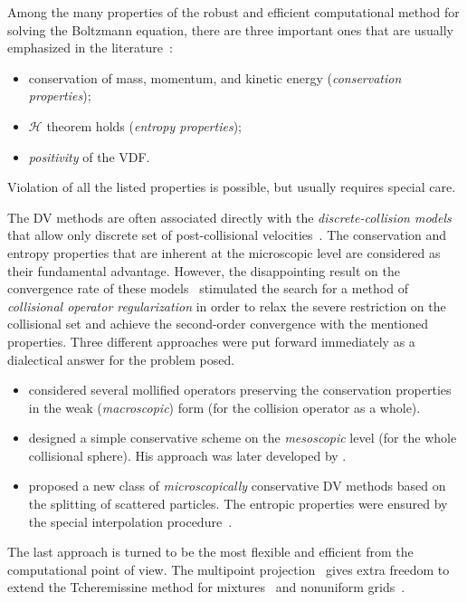 \documentclass{aip-cp}
\begin{document}
Among the many properties of the robust and efficient computational method for solving the Boltzmann equation,
there are three important ones that are usually emphasized in the literature~\cite{Dimarco2014}:
\begin{itemize}
    \item conservation of mass, momentum, and kinetic energy (\emph{conservation properties});
    \item \(\mathcal{H}\) theorem holds (\emph{entropy properties});
    \item \emph{positivity} of the VDF.
\end{itemize}
Violation of all the listed properties is possible, but usually requires special care.

The DV methods are often associated directly with the \emph{discrete-collision models}
that allow only discrete set of post-collisional velocities~\cite{Goldstein1989}.
The conservation and entropy properties that are inherent at the microscopic level are considered as their fundamental advantage.
However, the disappointing result on the convergence rate of these models~\cite{Palczewski1997}
stimulated the search for a method of \emph{collisional operator regularization}
in order to relax the severe restriction on the collisional set
and achieve the second-order convergence with the mentioned properties.
Three different approaches were put forward immediately as a dialectical answer for the problem posed.
\begin{itemize}
    \item \citet{Buet1998} considered several mollified operators preserving the conservation properties
    in the weak (\emph{macroscopic}) form (for the collision operator as a whole).
    \item \citet{Babovsky1998} designed a simple conservative scheme on the \emph{mesoscopic} level
    (for the whole collisional sphere). His approach was later developed by \citet{Goersch2002}.
    \item \citet{Tcheremissine1998} proposed a new class of \emph{microscopically} conservative DV methods
    based on the splitting of scattered particles.
    The entropic properties were ensured by the special interpolation procedure~\cite{Tcheremissine2006}.
\end{itemize}
The last approach is turned to be the most flexible and efficient from the computational point of view.
The multipoint projection~\cite{Beylich2000, Varghese2007} gives extra freedom to extend the Tcheremissine method
for mixtures~\cite{Dodulad2012} and nonuniform grids~\cite{Rogozin2016}.
\end{document}
